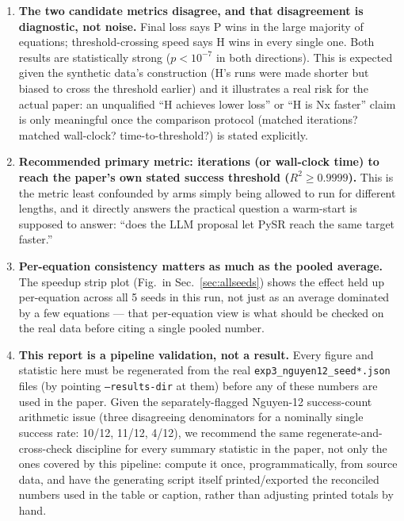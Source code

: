 \documentclass[11pt]{article}
\newcommand{\Rsq}{R^2}
\begin{document}
\begin{enumerate}
  \item \textbf{The two candidate metrics disagree, and that disagreement is diagnostic, not
    noise.} Final loss says P wins in the large majority of equations; threshold-crossing speed
    says H wins in every single one. Both results are statistically strong
    ($p < 10^{-7}$ in both directions). This is expected given the synthetic data's construction
    (H's runs were made shorter but biased to cross the threshold earlier) and it illustrates a
    real risk for the actual paper: an unqualified ``H achieves lower loss'' or ``H is Nx faster''
    claim is only meaningful once the comparison protocol (matched iterations? matched wall-clock?
    time-to-threshold?) is stated explicitly.
  \item \textbf{Recommended primary metric: iterations (or wall-clock time) to reach the paper's
    own stated success threshold ($\Rsq \ge 0.9999$).} This is the metric least confounded by
    arms simply being allowed to run for different lengths, and it directly answers the practical
    question a warm-start is supposed to answer: ``does the LLM proposal let PySR reach the same
    target faster.''
  \item \textbf{Per-equation consistency matters as much as the pooled average.} The speedup strip
    plot (Fig.\ in Sec.~\ref{sec:allseeds}) shows the effect held up per-equation across all 5
    seeds in this run, not just as an average dominated by a few equations --- that per-equation
    view is what should be checked on the real data before citing a single pooled number.
  \item \textbf{This report is a pipeline validation, not a result.} Every figure and statistic
    here must be regenerated from the real \texttt{exp3\_nguyen12\_seed*.json} files (by pointing
    \texttt{--results-dir} at them) before any of these numbers are used in the paper. Given the
    separately-flagged Nguyen-12 success-count arithmetic issue (three disagreeing denominators
    for a nominally single success rate: 10/12, 11/12, 4/12), we recommend the same
    regenerate-and-cross-check discipline for every summary statistic in the paper, not only the
    ones covered by this pipeline: compute it once, programmatically, from source data, and have
    the generating script itself printed/exported the reconciled numbers used in the table or
    caption, rather than adjusting printed totals by hand.
\end{enumerate}
\end{document}
